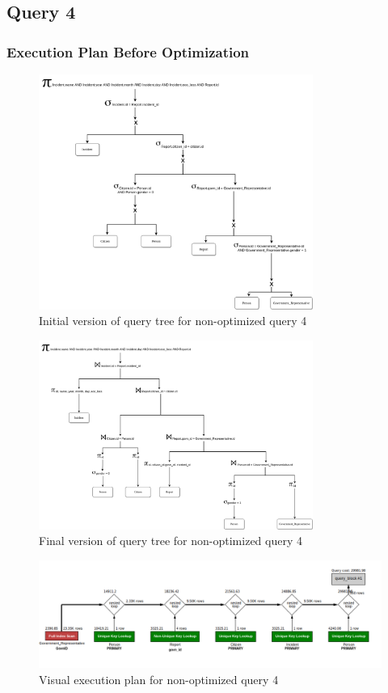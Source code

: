 \subsection{Query 4}

\subsubsection{Execution Plan Before Optimization}
\begin{figure}[H]
    \centering
    \includegraphics[width=0.8\textwidth]{images/query_trees/query4-non-optimized-initial-version.png}
    \caption{Initial version of query tree for non-optimized query 4}
\end{figure}
\begin{figure}[H]
    \centering
    \includegraphics[width=0.8\textwidth]{images/query_trees/query4-non-optimized-final-version.png}
    \caption{Final version of query tree for non-optimized query 4}
\end{figure}
\begin{figure}[H]
    \centering
    \includegraphics[width=\textwidth]{images/execution_plans/q4-1-old.png}
    \caption{Visual execution plan for non-optimized query 4}
\end{figure}

